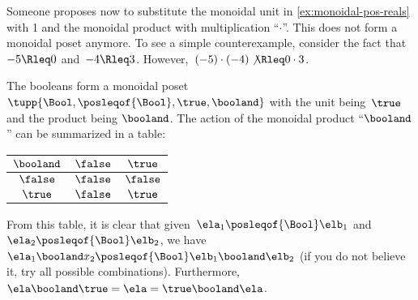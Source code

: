 \begin{counterexample}
    Someone proposes now to substitute the monoidal unit in \cref{ex:monoidal-pos-reals} with 1 and the monoidal product with multiplication ``$\cdot$''.
    This does not form a monoidal poset anymore.
    To see a simple counterexample, consider the fact that~$-5\Rleq 0$ and~$-4\Rleq 3$.
    However,~$(-5)\cdot (-4) \not{\Rleq} 0 \cdot 3$.
\end{counterexample}

\begin{example}
    The booleans form a monoidal poset $\tupp{\Bool,\posleqof{\Bool},\true,\booland}$
    with the unit being~$\true$ and the product being $\booland$.
    The action of the monoidal product ``$\booland$'' can be summarized in a table:
    \begin{center}
        \begin{tabular}{c|cc}
            $\booland$ & $\false$ & $\true$ \\
            \hline
            $\false$   & $\false$ & $\false$ \\
            $\true$    & $\false$ & $\true$
        \end{tabular}
    \end{center}
    From this table, it is clear that given~$\ela_1\posleqof{\Bool}\elb_1$ and~$\ela_2\posleqof{\Bool} \elb_2$, we have~$\ela_1\booland x_2\posleqof{\Bool} \elb_1\booland \elb_2$ (if you do not believe it, try all possible combinations).
    Furthermore,~$\ela\booland \true=\ela=\true \booland \ela$.
\end{example}


